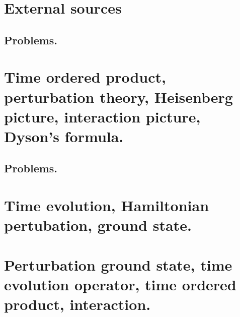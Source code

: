    \chapter{External sources}
      
      
      
      
      \section{Problems.}
         
         
   \chapter{Time ordered product, perturbation theory, Heisenberg picture, interaction picture, Dyson's formula.}
      
      \section{Problems.}
         
   \chapter{Time evolution, Hamiltonian pertubation, ground state.}
      
   \chapter{Perturbation ground state, time evolution operator, time ordered product, interaction.}
      
      
